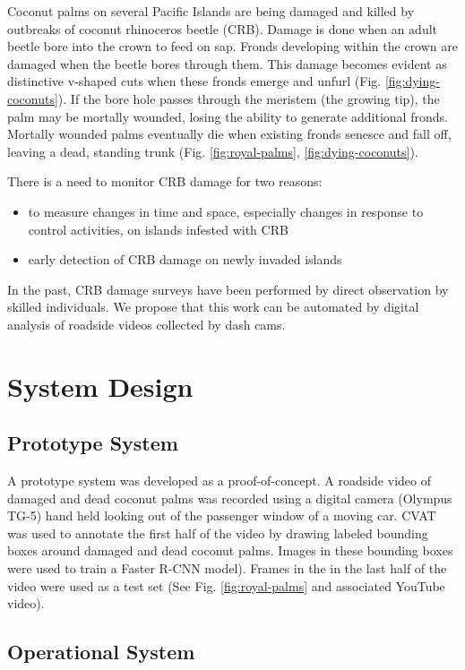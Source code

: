 \documentclass[12pt,letterpaper,english,bibliography=totocnumbered, abstract=on]{scrartcl}
\begin{document}
Coconut palms on several Pacific Islands are being damaged and killed by outbreaks of coconut rhinoceros beetle (CRB). Damage is done when an adult beetle bore into the crown to feed on sap. Fronds developing within the crown are damaged when the beetle bores through them. This damage becomes evident as distinctive v-shaped cuts when these fronds emerge and unfurl (Fig. \ref{fig:dying-coconuts}). If the bore hole passes through the meristem (the growing tip), the palm may be mortally wounded, losing the ability to generate additional fronds. Mortally wounded palms eventually die when existing fronds senesce and fall off, leaving a dead, standing trunk (Fig. \ref{fig:royal-palms}, \ref{fig:dying-coconuts}).

There is a need to monitor CRB damage for two reasons:
\begin{itemize}
	\item to measure changes in time and space, especially changes in response to control activities, on islands infested with CRB
	\item early detection of CRB damage on newly invaded islands
\end{itemize}
In the past, CRB damage surveys have been performed by direct observation by skilled individuals. We propose that this work can be automated by digital analysis of roadside videos collected by dash cams.  

\section{System Design}

\subsection{Prototype System}

A prototype system was developed as a proof-of-concept. A roadside video of damaged and dead coconut palms was recorded using a digital camera (Olympus TG-5) hand held looking out of the passenger window of a moving car. CVAT was used to annotate the first half of the video by drawing labeled bounding boxes around damaged and dead coconut palms. Images in these bounding boxes were used to train a Faster R-CNN model). Frames in the in the last half of the video were used as a test set (See Fig. \ref{fig:royal-palms} and associated YouTube video). 

\subsection{Operational System}
\end{document}
